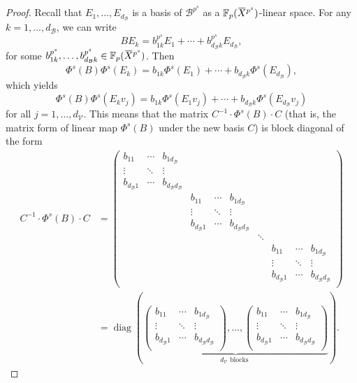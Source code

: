 \documentclass[letterpaper, 11pt, thm-restate]{article}
\numberwithin{equation}{section}
\newcommand{\F}{\mathbb{F}}
\newcommand{\diag}{\operatorname{diag}}
\newcommand{\mV}{\mathcal{V}}
\newcommand{\mB}{\mathcal{B}}
\newcommand{\oX}{\mkern 1.5mu\overline{\mkern-1.5mu X \mkern-1.5mu}\mkern 1.5mu}
\theoremstyle{definition}
\theoremstyle{definition}
\theoremstyle{definition}
\begin{document}
\begin{proof}
    Recall that $E_1, \ldots, E_{d_{\mB}}$ is a basis of $\mB^{p^{s}}$ as a $\F_p(\oX^{p^{s}})$-linear space.
    For any $k = 1, \ldots, d_{\mB}$, we can write 
    \begin{equation}\label{eq:BE}
        B E_k = b_{1k}^{p^s} E_1 + \cdots + b_{d_{\mB} k}^{p^s} E_{d_{\mB}},
    \end{equation}
    for some $b_{1k}^{p^s}, \ldots, b_{d_{\mB} k}^{p^s} \in \F_p(\oX^{p^s})$.
    Then
    \[
    \Phi^{s}(B) \Phi^{s}(E_k) = b_{1k} \Phi^{s}(E_1) + \cdots + b_{d_{\mB} k} \Phi^{s}(E_{d_{\mB}}),
    \]
    which yields
    \[
    \Phi^{s}(B) \Phi^{s}(E_k v_j) = b_{1k} \Phi^{s}(E_1 v_j) + \cdots + b_{d_{\mB} k} \Phi^{s}(E_{d_{\mB}} v_j)
    \]
    for all $j = 1, \ldots, d_{\mV}$.
    This means that the matrix $C^{-1} \cdot \Phi^{s}(B) \cdot C$ (that is, the matrix form of linear map $\Phi^{s}(B)$ under the new basis $C$) is block diagonal of the form
    \begin{align}\label{eq:CBC}
    C^{-1} \cdot \Phi^{s}(B) \cdot C & =
    \begin{pmatrix}
        b_{11} & \cdots & b_{1d_{\mB}} &   &   &   &   &   &   &   \\
        \vdots & \ddots & \vdots&&&&&&& \\
        b_{d_{\mB}1} & \cdots & b_{d_{\mB}d_{\mB}} & &&&&&& \\
        &&& b_{11} & \cdots & b_{1d_{\mB}} \\
        &&&\vdots & \ddots & \vdots \\
        &&& b_{d_{\mB}1} & \cdots & b_{d_{\mB}d_{\mB}} \\
        &&&&&&\ddots \\
        &&&&&&& b_{11} & \cdots & b_{1d_{\mB}} \\
        &&&&&&& \vdots & \ddots & \vdots \\
        &&&&&&& b_{d_{\mB}1} & \cdots & b_{d_{\mB}d_{\mB}} \\
    \end{pmatrix} \nonumber \\
    & = \diag \left(\underbrace{
    \begin{pmatrix}
        b_{11} & \cdots & b_{1d_{\mB}}   \\
        \vdots & \ddots & \vdots \\
        b_{d_{\mB}1} & \cdots & b_{d_{\mB}d_{\mB}}\\
    \end{pmatrix}, \ldots,
    \begin{pmatrix}
        b_{11} & \cdots & b_{1d_{\mB}}   \\
        \vdots & \ddots & \vdots \\
        b_{d_{\mB}1} & \cdots & b_{d_{\mB}d_{\mB}}\\
    \end{pmatrix}}_{d_{\mV} \text{ blocks }}\right).
    \end{align}
    

\end{proof}
\end{document}

